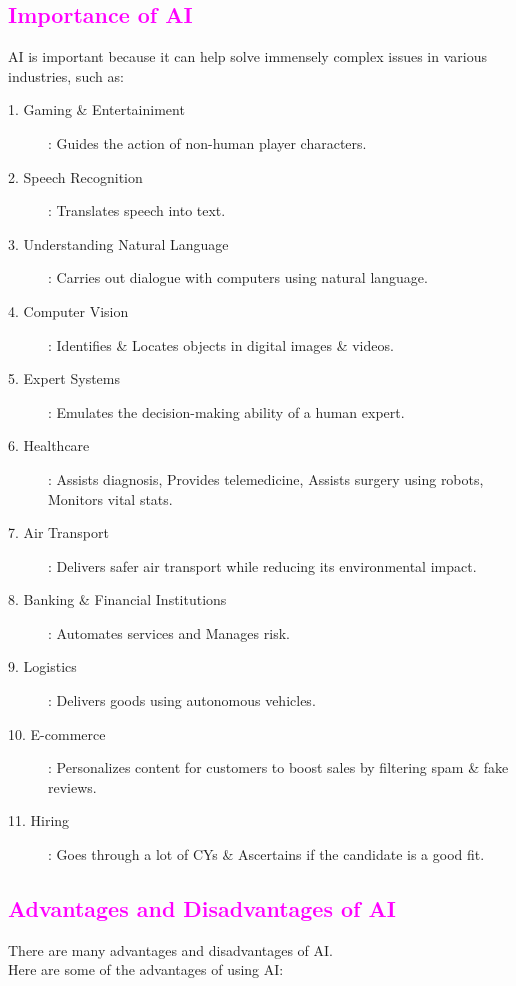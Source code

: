 \documentclass{book}
\begin{document}
\textcolor{magenta}{\section{\textbf{Importance of AI}}}
AI is important because it can help solve immensely complex issues in various industries, such as:
\begin{description}
    \item[1. Gaming \& Entertainiment]: Guides the action of non-human player characters.
    \item[2. Speech Recognition]: Translates speech into text.
    \item[3. Understanding Natural Language]: Carries out dialogue with computers using natural language.
    \item[4. Computer Vision]: Identifies \& Locates objects in digital images \& videos.
    \item[5. Expert Systems]: Emulates the decision-making ability of a human expert.
    \item[6. Healthcare]: Assists diagnosis, Provides telemedicine, Assists surgery using robots, Monitors vital stats.
    \item[7. Air Transport]: Delivers safer air transport while reducing its environmental impact.
    \item[8. Banking \& Financial Institutions]: Automates services and Manages risk.
    \item[9. Logistics]: Delivers goods using autonomous vehicles.
    \item[10. E-commerce]: Personalizes content for customers to boost sales by filtering spam \& fake reviews.
    \item[11. Hiring]: Goes through a lot of CYs \& Ascertains if the candidate is a good fit.          
\end{description}
\textcolor{magenta}{\section{\textbf{Advantages and Disadvantages of AI}}}
There are many advantages and disadvantages of AI.\\
Here are some of the advantages of using AI:
\end{document}
